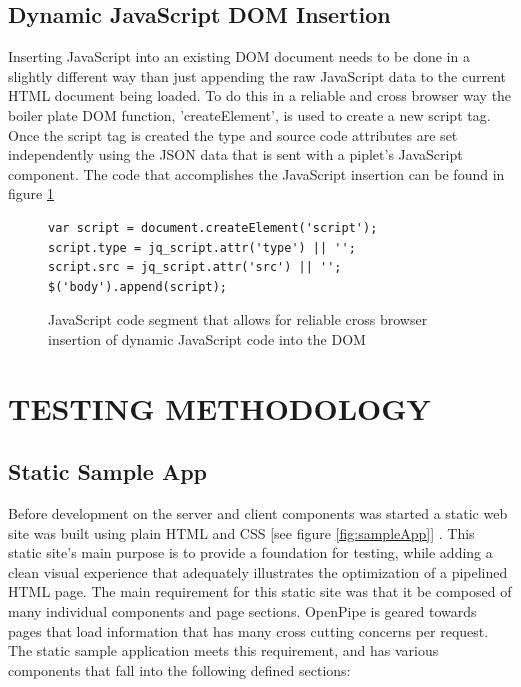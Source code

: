 \documentclass[12pt]{report}
\begin{document}
\section{Dynamic JavaScript DOM Insertion}

Inserting JavaScript into an existing DOM document needs to be done in a slightly different way than just appending the raw JavaScript data to the current HTML document being loaded. To do this in a reliable and cross browser way the boiler plate DOM function, 'createElement', is used to create a new script tag. Once the script tag is created the type and source code attributes are set independently using the JSON data that is sent with a piplet's JavaScript component. The code that accomplishes the JavaScript insertion can be found in figure \ref{fig:javascriptInsertion}

\begin{figure}[H]
\label{fig:javascriptInsertion}
\begin{lstlisting}
var script = document.createElement('script');
script.type = jq_script.attr('type') || '';
script.src = jq_script.attr('src') || '';
$('body').append(script);
\end{lstlisting}
\caption{JavaScript code segment that allows for reliable cross browser insertion of dynamic JavaScript code into the DOM}
\end{figure}

\chapter{TESTING METHODOLOGY}

\section{Static Sample App}
Before development on the server and client components was started a static web site was built using plain HTML and CSS [see figure \ref{fig:sampleApp}] . This static site’s main purpose is to provide a foundation for testing, while adding a clean visual experience that adequately illustrates the optimization of a pipelined HTML page. The main requirement for this static site was that it be composed of many individual components and page sections. OpenPipe is geared towards pages that load information that has many cross cutting concerns per request. The static sample application meets this requirement, and has various components that fall into the following defined sections:
\end{document}
